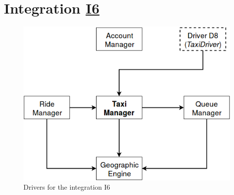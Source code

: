 \section{Integration \hyperref[I6]{I6} \label{int_I6}}
\begin{figure}[H]
\centering
\includegraphics[scale = 0.5]{"../Analysis Documents/I6"}
\caption{Drivers for the integration I6}
\end{figure}